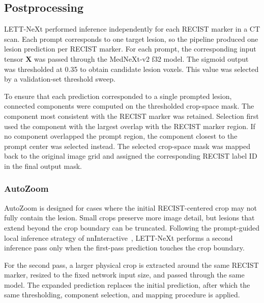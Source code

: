 \subsection{Postprocessing}
\label{sec:inference_autozoom}
LETT-NeXt performed inference independently for each RECIST marker in a CT scan. 
Each prompt corresponds to one target lesion, so the pipeline produced one lesion prediction per RECIST marker. 
For each prompt, the corresponding input tensor \(\mathbf{X}\) was passed through the MedNeXt-v2 f32 model.
The sigmoid output was thresholded at 0.35 to obtain candidate lesion voxels. This value was selected by a validation-set threshold sweep.

To ensure that each prediction corresponded to a single prompted lesion, connected components were computed on the thresholded crop-space mask. 
The component most consistent with the RECIST marker was retained. 
Selection first used the component with the largest overlap with the RECIST marker region. 
If no component overlapped the prompt region, the component closest to the prompt center was selected instead. 
The selected crop-space mask was mapped back to the original image grid and assigned the corresponding RECIST label ID in the final output mask.

\subsubsection{AutoZoom}

AutoZoom is designed for cases where the initial RECIST-centered crop may not fully contain the lesion. Small crops preserve more image detail, but lesions that extend beyond the crop boundary can be truncated. Following the prompt-guided local inference strategy of nnInteractive~\cite{isenseeNnInteractiveRedefining3D2025}, LETT-NeXt performs a second inference pass only when the first-pass prediction touches the crop boundary.

For the second pass, a larger physical crop is extracted around the same RECIST marker, resized to the fixed network input size, and passed through the same model. The expanded prediction replaces the initial prediction, after which the same thresholding, component selection, and mapping procedure is applied.
